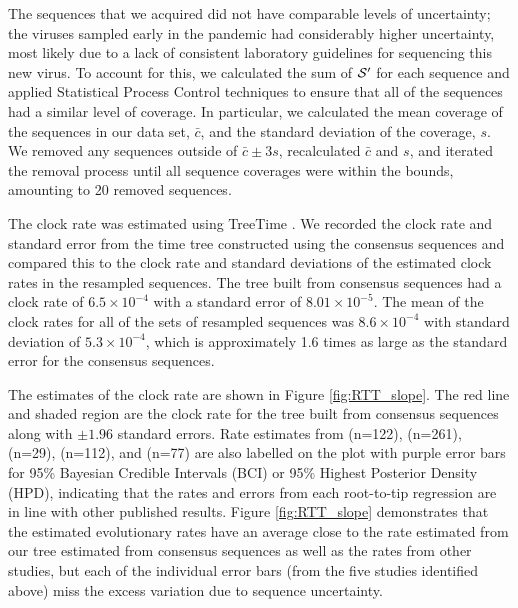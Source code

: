 \documentclass[10pt]{article}
\begin{document}
The sequences that we acquired did not have comparable levels of uncertainty; the viruses sampled early in the pandemic had considerably higher uncertainty, most likely due to a lack of consistent laboratory guidelines for sequencing this new virus.
To account for this, we calculated the sum of $\mathcal{S}'$ for each sequence and applied Statistical Process Control techniques to ensure that all of the sequences had a similar level of coverage.
In particular, we calculated the mean coverage of the sequences in our data set, $\bar c$, and the standard deviation of the coverage, $s$.
We removed any sequences outside of $\bar c \pm 3 s$, recalculated $\bar c$ and $s$, and iterated the removal process until all sequence coverages were within the bounds, amounting to 20 removed sequences.


The clock rate was estimated using TreeTime \citep{sagulenkoTreeTimeMaximumlikelihoodPhylodynamic2018}.
We recorded the clock rate and standard error from the time tree constructed using the consensus sequences and compared this to the clock rate and standard deviations of the estimated clock rates in the resampled sequences.
The tree built from consensus sequences had a clock rate of $6.5\times 10^{-4}$ with a standard error of $8.01\times 10^{-5}$.
The mean of the clock rates for all of the sets of resampled sequences was $8.6\times 10^{-4}$ with standard deviation of $5.3\times 10^{-4}$, which is approximately 1.6 times as large as the standard error for the consensus sequences.


The estimates of the clock rate are shown in Figure \ref{fig:RTT_slope}.
The red line and shaded region are the clock rate for the tree built from consensus sequences along with $\pm 1.96$ standard errors.
Rate estimates from \citet{ducheneTemporalSignalPhylodynamic2020} (n=122), \citet{choudharySevereAcuteRespiratory2021} (n=261), \citet{songGenomicEpidemiologySARSCoV22021} (n=29), \citet{niePhylogeneticPhylodynamicAnalyses2020} (n=112), and \citet{geidelbergGenomicEpidemiologyDensely2021} (n=77) are also labelled on the plot with purple error bars for 95\% Bayesian Credible Intervals (BCI) or 95\% Highest Posterior Density (HPD), indicating that the rates and errors from each root-to-tip regression are in line with other published results.
Figure \ref{fig:RTT_slope} demonstrates that the estimated evolutionary rates have an average close to the rate estimated from our tree estimated from consensus sequences as well as the rates from other studies, but each of the individual error bars (from the five studies identified above) miss the excess variation due to sequence uncertainty.
\end{document}
